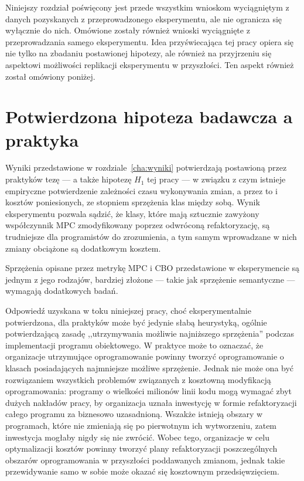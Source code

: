 Niniejszy rozdział poświęcony jest przede wszystkim wnioskom wyciągniętym z
danych pozyskanych z przeprowadzonego eksperymentu, ale nie ogranicza się
wyłącznie do nich.
Omówione zostały również wnioski wyciągnięte z przeprowadzania samego
eksperymentu.
Idea przyświecająca tej pracy opiera się nie tylko na zbadaniu postawionej
hipotezy, ale również na przyjrzeniu się aspektowi możliwości replikacji
eksperymentu w przyszłości.
Ten aspekt również został omówiony poniżej.

\section{Potwierdzona hipoteza badawcza a praktyka}

Wyniki przedstawione w rozdziale~\ref{cha:wyniki} potwierdzają postawioną
przez praktyków tezę --- a także hipotezę \(H_{1}\) tej pracy ---
w związku z czym istnieje empiryczne potwierdzenie zależności czasu
wykonywania zmian, a przez to i kosztów poniesionych, ze stopniem sprzężenia
klas między sobą.
Wynik eksperymentu pozwala sądzić, że klasy, które mają sztucznie zawyżony
współczynnik \acrshort{MPC} zmodyfikowany poprzez odwróconą refaktoryzację,
są trudniejsze dla programistów do zrozumienia, a tym samym wprowadzane
w nich zmiany obciążone są dodatkowym kosztem.

Sprzężenia opisane przez metrykę \acrshort{MPC} i \acrshort{CBO}
przedstawione w eksperymencie są jednym z jego rodzajów, bardziej
złożone --- takie jak sprzężenie semantyczne --- wymagają dodatkowych badań.

Odpowiedź uzyskana w toku niniejszej pracy, choć eksperymentalnie potwierdzona,
dla praktyków może być jedynie słabą heurystyką, ogólnie potwierdzającą zasadę
,,utrzymywania możliwie najniższego sprzężenia'' podczas implementacji
programu obiektowego.
W praktyce może to oznaczać, że organizacje utrzymujące oprogramowanie
powinny tworzyć oprogramowanie o klasach posiadających najmniejsze możliwe
sprzężenie.
Jednak nie może ona być rozwiązaniem wszystkich problemów związanych
z kosztowną modyfikacją oprogramowania: programy o wielkości milionów
linii kodu mogą wymagać zbyt dużych nakładów pracy, by organizacja
uznała inwestycję w formie refaktoryzacji całego programu za
biznesowo uzasadnioną.
Wszakże istnieją obszary w programach, które nie zmieniają się po
pierwotnym ich wytworzeniu, zatem inwestycja mogłaby nigdy się nie zwrócić.
Wobec tego, organizacje w celu optymalizacji kosztów powinny tworzyć
plany refaktoryzacji poszczególnych obszarów oprogramowania w przyszłości
poddawanych zmianom, jednak takie przewidywanie samo w sobie może okazać
się kosztownym przedsięwzięciem.


